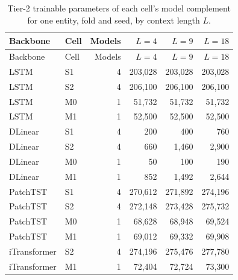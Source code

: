 \small
\setlength{\tabcolsep}{3pt}
\begin{longtable}{@{}llrrrr@{}}
\caption{Tier-2 trainable parameters of each cell's model complement for one entity, fold and seed, by context length $L$.}\label{tab:supp-t2-params}\\
\toprule
Backbone & Cell & Models & $L=4$ & $L=9$ & $L=18$ \\
\midrule
\endfirsthead
\toprule
Backbone & Cell & Models & $L=4$ & $L=9$ & $L=18$ \\
\midrule
\endhead
\bottomrule
\endfoot
LSTM & S1 & 4 & 203{,}028 & 203{,}028 & 203{,}028 \\
LSTM & S2 & 4 & 206{,}100 & 206{,}100 & 206{,}100 \\
LSTM & M0 & 1 & 51{,}732 & 51{,}732 & 51{,}732 \\
LSTM & M1 & 1 & 52{,}500 & 52{,}500 & 52{,}500 \\
DLinear & S1 & 4 & 200 & 400 & 760 \\
DLinear & S2 & 4 & 660 & 1{,}460 & 2{,}900 \\
DLinear & M0 & 1 & 50 & 100 & 190 \\
DLinear & M1 & 1 & 852 & 1{,}492 & 2{,}644 \\
PatchTST & S1 & 4 & 270{,}612 & 271{,}892 & 274{,}196 \\
PatchTST & S2 & 4 & 272{,}148 & 273{,}428 & 275{,}732 \\
PatchTST & M0 & 1 & 68{,}628 & 68{,}948 & 69{,}524 \\
PatchTST & M1 & 1 & 69{,}012 & 69{,}332 & 69{,}908 \\
iTransformer & S2 & 4 & 274{,}196 & 275{,}476 & 277{,}780 \\
iTransformer & M1 & 1 & 72{,}404 & 72{,}724 & 73{,}300 \\
\end{longtable}
\normalsize\setlength{\tabcolsep}{4pt}
\small
\setlength{\tabcolsep}{3pt}
